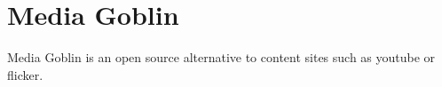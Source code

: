 \chapter{Media Goblin}
\label{chp:mediagoblin}

Media Goblin is an open source alternative to content sites such as youtube or flicker.